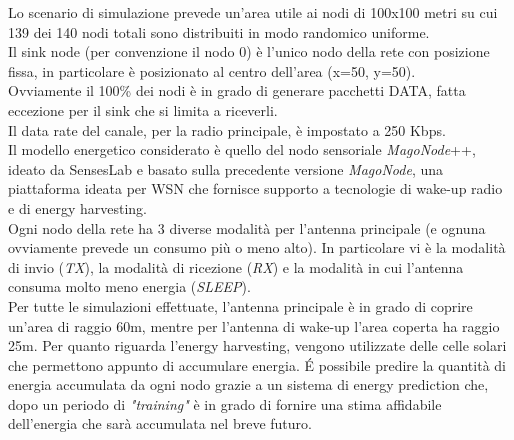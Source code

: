 Lo scenario di simulazione prevede un'area utile ai nodi di 100x100 metri su cui 139 dei 140 nodi totali sono distribuiti in modo randomico uniforme. \\
Il sink node (per convenzione il nodo 0) è l'unico nodo della rete con posizione fissa, in particolare è posizionato al centro dell'area (x=50, y=50). \\
Ovviamente il 100\% dei nodi è in grado di generare pacchetti DATA, fatta eccezione per il sink che si limita a riceverli.\\

Il data rate del canale, per la radio principale,  è impostato a 250 Kbps. \\
Il modello energetico considerato è quello del nodo sensoriale \textit{MagoNode}++\cite{magonode++}, ideato da SensesLab e basato sulla precedente versione \textit{MagoNode}\cite{magonode}, una piattaforma ideata per WSN che fornisce supporto a tecnologie di wake-up radio e di energy harvesting.\\

Ogni nodo della rete ha 3 diverse modalità per l'antenna principale (e ognuna ovviamente prevede un consumo più o meno alto). In particolare vi è la modalità di invio (\textit{TX}), la modalità di ricezione (\textit{RX}) e la modalità in cui l'antenna consuma molto meno energia (\textit{SLEEP}). \\

Per tutte le simulazioni effettuate, l'antenna principale è in grado di coprire un'area di raggio 60m, mentre per l'antenna di wake-up l'area coperta ha raggio 25m.
Per quanto riguarda l'energy harvesting, vengono utilizzate delle celle solari che permettono appunto di accumulare energia. \'E possibile predire la quantità di energia accumulata da ogni nodo grazie a un sistema di energy prediction che, dopo un periodo di \textit{"training"} è in grado di fornire una stima affidabile dell'energia che sarà accumulata nel breve futuro.\\

